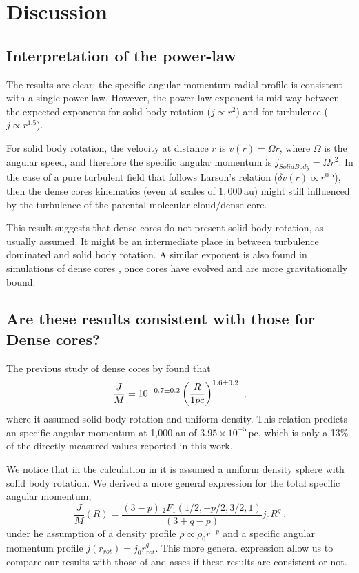 \section{Discussion}

\subsection{Interpretation of the power-law}
The results are clear: the specific angular momentum radial profile is consistent with a single power-law. 
However, the power-law exponent is mid-way between the expected exponents 
for solid body rotation ($j\propto r^{2}$) and for turbulence ($j\propto r^{1.5}$). 

For solid body rotation, the velocity at distance $r$ is $v(r)=\Omega r$, 
where $\Omega$ is the angular speed, 
and therefore the specific angular momentum is $j_{SolidBody}=\Omega r^2$. 
In the case of a pure turbulent field that follows Larson's relation ($\delta v(r) \propto r^{0.5}$),  
then the dense cores kinematics (even at scales of $1,000$\,au) might still 
influenced by the turbulence of the parental molecular cloud/dense core.

This result suggests that dense cores do not present solid body rotation, as usually assumed. 
It might be an intermediate place in between turbulence dominated and solid body rotation.
%
A similar exponent is also found in simulations of dense cores \citep{Dib_2010}, once cores 
have evolved and are more gravitationally bound.

\subsection{Are these results consistent with those for Dense cores?}
The previous study of dense cores by \cite{Goodman_1993} found that 
\begin{equation}
\frac{J}{M} = 10^{-0.7\pm0.2} \left(\frac{R}{\textrm 1 pc}\right)^{1.6\pm 0.2}~,
\end{equation}
where it assumed solid body rotation and uniform density. 
This relation predicts an specific angular momentum at 1,000 au of $3.95\times 10^{-5}$\,\kms pc, 
which is only a 13\% of the directly measured values reported in this work.

We notice that in the calculation in \cite{Goodman_1993} it is assumed a uniform density sphere 
with solid body rotation. 
We derived a more general expression for the total specific angular momentum, 
\begin{equation}
\label{eq:J_M}
\frac{J}{M}(R) = \frac{(3-p)\,{}_2F_1(1/2,−p/2,3/2,1)}{(3+q-p)} j_0 R^{q}~.
\end{equation}
under he assumption of a density profile $\rho \propto \rho_0 r^{-p}$ and a specific angular momentum 
profile $j(r_{rot}) = j_0 r_{rot}^q$. 
This more general expression allow us to compare our results with those of \cite{Goodman_1993} and asses 
if these results are consistent or not.

